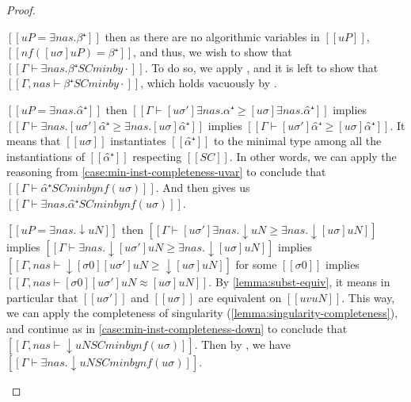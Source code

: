 \begin{proof}
\begin{caseof}

        \item $[[uP = ∃nas.β⁺]]$ then 
            as there are no algorithmic variables in $[[uP]]$, 
            $[[nf([uσ]uP) = β⁺]]$,
            and thus, we wish to show that 
            $[[Γ ⊢ ∃nas.β⁺ SC minby ·]]$.
            To do so, we apply ,
            and it is left to show that $[[Γ, nas ⊢ β⁺ SC minby · ]]$,
            which holds vacuously by .
        \item $[[uP = ∃nas.α̂⁺]]$ then 
            $[[Γ ⊢ [uσ']∃nas.α̂⁺ ≥ [uσ]∃nas.α̂⁺ ]]$ implies 
            $[[Γ ⊢ ∃nas.[uσ']α̂⁺ ≥ ∃nas.[uσ]α̂⁺ ]]$ implies 
            $[[Γ ⊢ [uσ']α̂⁺ ≥ [uσ]α̂⁺ ]]$.
            It means that $[[uσ]]$ instantiates $[[α̂⁺]]$ to the minimal 
            type among all the instantiations of $[[α̂⁺]]$ respecting $[[SC]]$.
            In other words, we can apply the reasoning from 
            \cref{case:min-inst-completeness-uvar}
            to conclude that $[[Γ ⊢ α̂⁺ SC minby nf(uσ) ]]$.
            And then 
            gives us $[[Γ ⊢ ∃nas.α̂⁺ SC minby nf(uσ) ]]$.
        \item $[[uP = ∃nas.↓uN]]$ then 
            $[[Γ ⊢ [uσ']∃nas.↓uN ≥ ∃nas.↓[uσ]uN ]]$ implies 
            $[[Γ ⊢ ∃nas.↓[uσ']uN ≥ ∃nas.↓[uσ]uN ]]$ implies
            $[[Γ, nas ⊢ ↓[σ0][uσ']uN ≥ ↓[uσ]uN ]]$ for some $[[σ0]]$ implies
            $[[Γ, nas ⊢ [σ0][uσ']uN ≈ [uσ]uN ]]$.
            By \cref{lemma:subst-equiv}, it means in particular
            that $[[uσ']]$ and $[[uσ]]$ are equivalent on 
            $[[uv uN]]$. 
            This way, we can apply the completeness of singularity 
            (\cref{lemma:singularity-completeness}), and continue as in
            \cref{case:min-inst-completeness-down}
            to conclude that $[[Γ, nas ⊢ ↓uN SC minby nf(uσ)]]$.
            Then by ,
            we have $[[Γ ⊢ ∃nas.↓uN SC minby nf(uσ)]]$.
    \end{caseof}
\end{proof}

